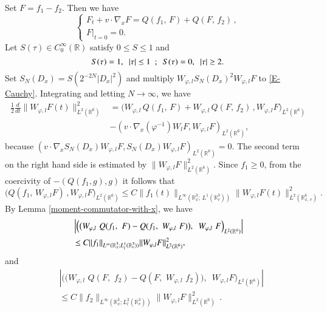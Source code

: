 \documentclass{amsart}[12pt, article]
\begin{document}
Set $F=f_1-f_2$. Then we have
\begin{equation}\label{E-Cauchy}
\left\{\begin{array}{l}
F_t+v\cdot\nabla_x F =Q(f_1,\, F)+Q(F,\, f_2)\, ,\\
F|_{t=0}=0.
\end{array}\right.
\end{equation}
Let $S(\tau) \in C_0^\infty({{{\mathbb R}}})$ satisfy $0 \leq S \leq 1$ and
$$S(\tau)=1, \enskip |\tau| \leq 1 \enskip; \enskip S(\tau)=0, \enskip |\tau| \geq 2. $$
Set $S_N(D_x) = S(2^{-2N}|D_x|^2)$ and multiply $W_{\varphi, l} S_N(D_x)^2 W_{\varphi, l} F$
to \eqref{E-Cauchy}. Integrating and letting $N \rightarrow \infty$, we have
\begin{align*}
\frac 12 \frac{d}{d t} \|  W_{\varphi, l} F(t)\|^2_{L^2({{{\mathbb R}}}^6)}&=\Big(W_{\varphi,l}\,
Q(f_1,\, F)+W_{\varphi, l}\, Q(F,\, f_2)\, , W_{\varphi,l} F\Big)_{L^2({{{\mathbb R}}}^6)}\\
&- ( v\cdot \nabla_x (\varphi^{-1}) W_l F, W_{\varphi,l} F)_{L^2({{{\mathbb R}}}^6)}, 
\end{align*}
because
$( v\cdot \nabla_x S_N(D_x)W_{\varphi, l }F, S_N(D_x)W_{\varphi,l} F)_{L^2({{{\mathbb R}}}^6)} =0$.
The second term on the right hand side is estimated by $\|W_{\varphi,l} F\|^2_{L^2({{{\mathbb R}}}^6)}$.
Since $f_1\geq 0$, {}from the coercivity  of $-(Q(f_1, g), g)$ it follows that
$$
\Big(Q(f_1,\, W_{\varphi, l }F)\, ,W_{\varphi,l }F\Big)_{L^2({{{\mathbb R}}}^6)}\leq C
\|f_1(t)\|_{L^\infty({{{\mathbb R}}}^3_x; \,L^1({{{\mathbb R}}}^3_{v}))}
\|W_{\varphi,l} F(t)\|^2_{L^2({{{\mathbb R}}}^6_{x, \, v})}.
$$
By Lemma \ref{moment-commutator-with-x},
we have 
\begin{align*}
&\left|\Big(\big(W_{\varphi,l}  \,\, Q(f_1,\,\,F)-Q(f_1,\,\,W_{\varphi,l}  \,\,
F)\big),\,\,\, W_{\varphi,l}  \,\,
F\Big)_{L^2({{{\mathbb R}}}^6)}\right| \\
&\leq C
\|f_1\|_{L^\infty({{{\mathbb R}}}_x^3; L^1_{l}({{{\mathbb R}}}^3_v))} \|W_{\varphi, l} F\|_{L^{2}
({{{\mathbb R}}}^6)} ^2, \notag
\end{align*}
and
\begin{align*}
&\left|\Big(\big(W_{\varphi, l}  \,\, Q(F,\,\,f_2)-Q(F,\,\,W_{\varphi,l}  \,\,
f_2)\big),\,\,\, W_{\varphi, l} F      \Big)_{L^2({{{\mathbb R}}}^6)}\right| \\
&\leq C \|f_2\|_{L^\infty({{{\mathbb R}}}^3_x; L^2_{l}({{{\mathbb R}}}^3_v))}
\|W_{\varphi, l}F\|^2_{L^2({{{\mathbb R}}}^6)}\,.
\end{align*}
\end{document}
